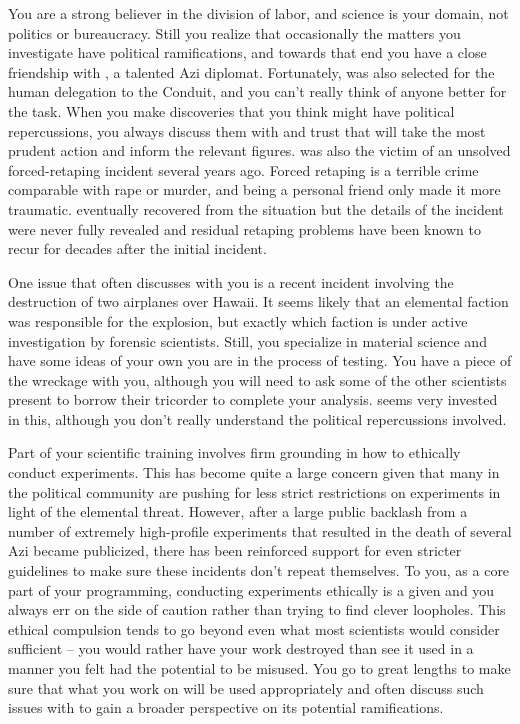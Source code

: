 \documentclass[char]{elementals}
\begin{document}
You are a strong believer in the division of labor, and science is your domain, not politics or bureaucracy. Still you realize that occasionally the matters you investigate have political ramifications, and towards that end you have a close friendship with \cDiplomat{\intro}, a talented Azi diplomat. Fortunately, \cDiplomat{} was also selected for the human delegation to the Conduit, and you can't really think of anyone better for the task. When you make discoveries that you think might have political repercussions, you always discuss them with \cDiplomat{} and trust that \cDiplomat{\they} will take the most prudent action and inform the relevant figures. \cDiplomat{} was also the victim of an unsolved forced-retaping incident several years ago. Forced retaping is a terrible crime comparable with rape or murder, and \cDiplomat{} being a personal friend only made it more traumatic. \cDiplomat{} eventually recovered from the situation but the details of the incident were never fully revealed and residual retaping problems have been known to recur for decades after the initial incident.

One issue that \cDiplomat{} often discusses with you is a recent incident involving the destruction of two airplanes over Hawaii. It seems likely that an elemental faction was responsible for the explosion, but exactly which faction is under active investigation by forensic scientists. Still, you specialize in material science and have some ideas of your own you are in the process of testing. You have a piece of the wreckage with you, although you will need to ask some of the other scientists present to borrow their tricorder to complete your analysis. \cDiplomat{} seems very invested in this, although you don't really understand the political repercussions involved.

Part of your scientific training involves firm grounding in how to ethically conduct experiments. This has become quite a large concern given that many in the political community are pushing for less strict restrictions on experiments in light of the elemental threat. However, after a large public backlash from a number of extremely high-profile experiments that resulted in the death of several Azi became publicized, there has been reinforced support for even stricter guidelines to make sure these incidents don't repeat themselves. To you, as a core part of your programming, conducting experiments ethically is a given and you always err on the side of caution rather than trying to find clever loopholes. This ethical compulsion tends to go beyond even what most scientists would consider sufficient -- you would rather have your work destroyed than see it used in a manner you felt had the potential to be misused. You go to great lengths to make sure that what you work on will be used appropriately and often discuss such issues with \cDiplomat{} to gain a broader perspective on its potential ramifications.
\end{document}
